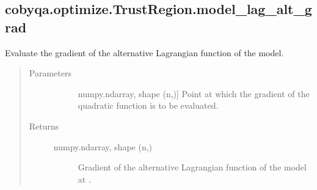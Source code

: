 \documentclass[letterpaper,10pt,english]{sphinxmanual}
\begin{document}
\begin{fulllineitems}
\begin{fulllineitems}
\begin{quote}
\begin{description}
\begin{description}
\end{description}

\end{description}\end{quote}

\end{fulllineitems}



\subsection{cobyqa.optimize.TrustRegion.model\_lag\_alt\_grad}
\label{\detokenize{refs/generated/cobyqa.optimize.TrustRegion.model_lag_alt_grad:cobyqa-optimize-trustregion-model-lag-alt-grad}}\label{\detokenize{refs/generated/cobyqa.optimize.TrustRegion.model_lag_alt_grad::doc}}

\begin{fulllineitems}
\label{\detokenize{refs/generated/cobyqa.optimize.TrustRegion.model_lag_alt_grad:cobyqa.optimize.TrustRegion.model_lag_alt_grad}}
\sphinxAtStartPar
Evaluate the gradient of the alternative Lagrangian function of the
model.
\begin{quote}\begin{description}
\item[{Parameters}] \leavevmode\begin{description}
\item[{}] \leavevmode{[}numpy.ndarray, shape (n,){]}
\sphinxAtStartPar
Point at which the gradient of the quadratic function is to be
evaluated.

\end{description}

\item[{Returns}] \leavevmode\begin{description}
\item[{numpy.ndarray, shape (n,)}] \leavevmode
\sphinxAtStartPar
Gradient of the alternative Lagrangian function of the model at .

\end{description}

\end{description}\end{quote}


\end{fulllineitems}
\end{fulllineitems}
\end{document}
